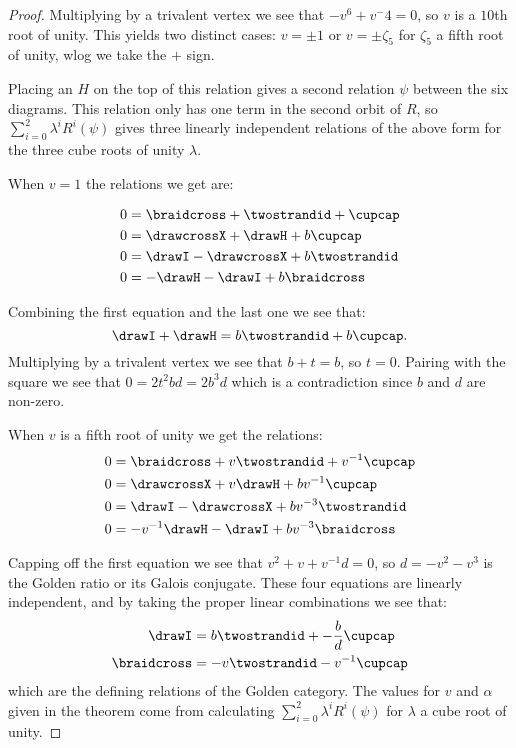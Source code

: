 \documentclass[12pt]{amsart}
\begin{document}
\begin{proof}
Multiplying by a trivalent vertex we see that $-v^6+v^-4=0$, so $v$ is a $10$th root of unity.  This yields two distinct cases: $v= \pm 1$ or $v = \pm \zeta_5$ for $\zeta_5$ a fifth root of unity, wlog we take the $+$ sign.

Placing an $H$ on the top of this relation gives a second relation $\psi$ between the six diagrams.  This relation only has one term in the second orbit of $R$, so $\sum_{i=0}^2 \lambda^i R^i(\psi)$ gives three linearly independent relations of the above form for the three cube roots of unity $\lambda$.  

When $v=1$ the relations we get are:

\begin{align*}
0 &= \braidcross + \twostrandid + \cupcap \\
0 &= \drawcrossX +\drawH + b\cupcap \\
0 &= \drawI - \drawcrossX + b\twostrandid \\
0 &= -\drawH -\drawI + b \braidcross
\end{align*}

Combining the first equation and the last one we see that:
$$\drawI+\drawH = b \twostrandid + b\cupcap.$$
Multiplying by a trivalent vertex we see that $b+t=b$, so $t = 0$.  Pairing with the square we see that $0 = 2t^2 bd = 2b^3 d$ which is a contradiction since $b$ and $d$ are non-zero.

When $v$ is a fifth root of unity we get the relations:
\begin{align*}
0 &= \braidcross + v\twostrandid + v^{-1}\cupcap \\
0 &= \drawcrossX +v \drawH + b v^{-1}\cupcap \\
0 &= \drawI - \drawcrossX + b v^{-3} \twostrandid \\
0 &= -v^{-1} \drawH -\drawI + b v^{-3} \braidcross
\end{align*}

Capping off the first equation we see that $v^2 + v +v^{-1}d = 0$, so $d = -v^2-v^3$ is the Golden ratio or its Galois conjugate.  These four equations are linearly independent, and by taking the proper linear combinations we see that:
\begin{align*}
\drawI &=  b\twostrandid + -\frac{b}{d} \cupcap \\
\braidcross &= -v\twostrandid -v^{-1} \cupcap \\
\end{align*}
which are the defining relations of the Golden category.  The values for $v$ and $\alpha$ given in the theorem come from calculating $\sum_{i=0}^2 \lambda^i R^i(\psi)$ for $\lambda$ a cube root of unity.
\end{proof}
\end{document}
